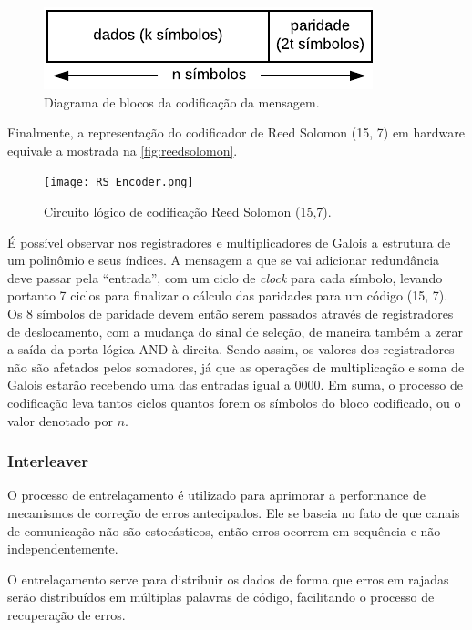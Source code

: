 	\begin{figure}[!htb]
		\caption{\label{fig_reed_solomon_message}Diagrama de blocos da codificação da mensagem.}
		\centering
		\includegraphics[width=0.4\textheight]{frame/rs-codeword.pdf}
	\end{figure}

	Finalmente, a representação do codificador de Reed Solomon (15, 7) em hardware equivale a mostrada na \autoref{fig:reedsolomon}.

	\begin{figure}[!htb]
		\caption{\label{RS_encoder_logic}Circuito lógico de codificação Reed Solomon (15,7).}
		\centering
		\texttt{[image: RS\_Encoder.png]}
		\label{fig:reedsolomon}
	\end{figure}

	É possível observar nos registradores e multiplicadores de Galois a estrutura de um polinômio e seus índices. A mensagem a que se vai adicionar redundância deve passar pela ``entrada'', com um ciclo de \textit{clock} para cada símbolo, levando portanto 7 ciclos para finalizar o cálculo das paridades para um código (15, 7). Os 8 símbolos de paridade devem então serem passados através de registradores de deslocamento, com a mudança do sinal de seleção, de maneira também a zerar a saída da porta lógica AND à direita. Sendo assim, os valores dos registradores não são afetados pelos somadores, já que as operações de multiplicação e soma de Galois estarão recebendo uma das entradas igual a 0000. Em suma, o processo de codificação leva tantos ciclos quantos forem os símbolos do bloco codificado, ou o valor denotado por $n$.

	\subsubsection*{Interleaver}

	O processo de entrelaçamento é utilizado para aprimorar a performance de mecanismos de correção de erros antecipados. Ele se baseia no fato de que canais de comunicação não são estocásticos, então erros ocorrem em sequência e não independentemente.

	O entrelaçamento serve para distribuir os dados de forma que erros em rajadas serão distribuídos em múltiplas palavras de código, facilitando o processo de recuperação de erros.

